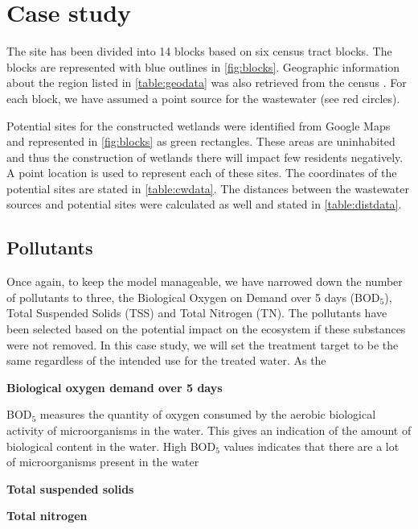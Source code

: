 \documentclass[preprint,12pt,authoryear]{elsarticle}
\begin{document}
\section{Case study}
The site has been divided into 14 blocks based on six census tract blocks. The blocks are represented with blue outlines in \autoref{fig:blocks}. Geographic information about the region listed in \autoref{table:geodata} was also retrieved from the census \citep{acs2015}.  For each block, we have assumed a point source for the wastewater (see red circles).

Potential sites for the constructed wetlands were identified from Google Maps and represented in \autoref{fig:blocks} as green rectangles. These areas are uninhabited and thus the construction of wetlands there will impact few residents negatively. A point location is used to represent each of these sites. The coordinates of the potential sites are stated in \autoref{table:cwdata}. The distances between the wastewater sources and potential sites were calculated as well and stated in \autoref{table:distdata}. 

\subsection{Pollutants} 
Once again, to keep the model manageable, we have narrowed down the number of pollutants to three, the Biological Oxygen on Demand over 5 days (BOD$_5$), Total Suspended Solids (TSS) and Total Nitrogen (TN). The pollutants have been selected based on the potential impact on the ecosystem if these substances were not removed. In this case study, we will set the treatment target to be the same regardless of the intended use for the treated water. As the 

\noindent\textbf{Biological oxygen demand over 5 days}

BOD$_5$ measures the quantity of oxygen consumed by the aerobic biological activity of microorganisms in the water. This gives an indication of the amount of biological content in the water. High BOD$_5$ values indicates that there are a lot of microorganisms present in the water 

\noindent\textbf{Total suspended solids}

\noindent\textbf{Total nitrogen}



\end{document}
